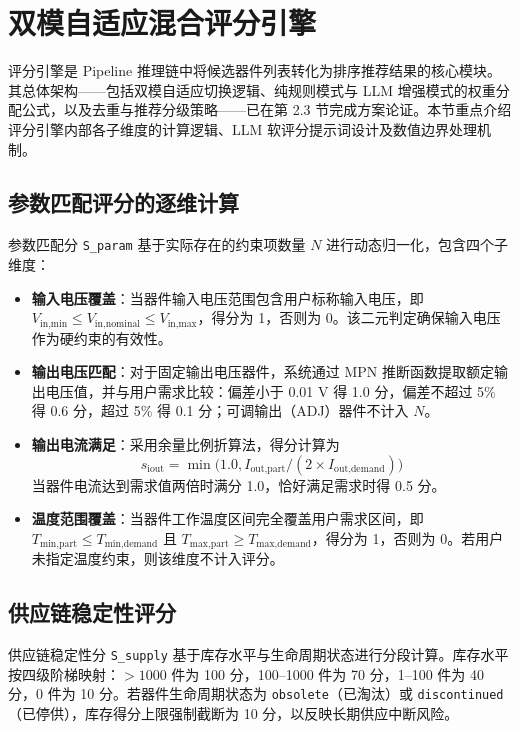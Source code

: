 \section{双模自适应混合评分引擎}

评分引擎是 Pipeline 推理链中将候选器件列表转化为排序推荐结果的核心模块。其总体架构——包括双模自适应切换逻辑、纯规则模式与 LLM 增强模式的权重分配公式，以及去重与推荐分级策略——已在第 2.3 节完成方案论证。本节重点介绍评分引擎内部各子维度的计算逻辑、LLM 软评分提示词设计及数值边界处理机制。

\subsection{参数匹配评分的逐维计算}

参数匹配分 \texttt{S\_param} 基于实际存在的约束项数量 $N$ 进行动态归一化，包含四个子维度：

\begin{itemize}
\item \textbf{输入电压覆盖}：当器件输入电压范围包含用户标称输入电压，即 $V_{\text{in,min}} \le V_{\text{in,nominal}} \le V_{\text{in,max}}$，得分为 1，否则为 0。该二元判定确保输入电压作为硬约束的有效性。

\item \textbf{输出电压匹配}：对于固定输出电压器件，系统通过 MPN 推断函数提取额定输出电压值，并与用户需求比较：偏差小于 0.01 V 得 1.0 分，偏差不超过 5\% 得 0.6 分，超过 5\% 得 0.1 分；可调输出（ADJ）器件不计入 $N$。

\item \textbf{输出电流满足}：采用余量比例折算法，得分计算为
\begin{equation}
    s_{\text{iout}} = \min\bigl(1.0, I_{\text{out,part}} / (2 \times I_{\text{out,demand}})\bigr)
\end{equation}
当器件电流达到需求值两倍时满分 1.0，恰好满足需求时得 0.5 分。

\item \textbf{温度范围覆盖}：当器件工作温度区间完全覆盖用户需求区间，即 $T_{\text{min,part}} \le T_{\text{min,demand}}$ 且 $T_{\text{max,part}} \ge T_{\text{max,demand}}$，得分为 1，否则为 0。若用户未指定温度约束，则该维度不计入评分。
\end{itemize}

\subsection{供应链稳定性评分}

供应链稳定性分 \texttt{S\_supply} 基于库存水平与生命周期状态进行分段计算。库存水平按四级阶梯映射：$>1000$ 件为 100 分，100–1000 件为 70 分，1–100 件为 40 分，0 件为 10 分。若器件生命周期状态为 \texttt{obsolete}（已淘汰）或 \texttt{discontinued}（已停供），库存得分上限强制截断为 10 分，以反映长期供应中断风险。

